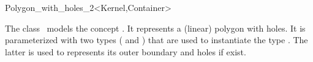 \ccRefPageBegin

\begin{ccRefClass}{Polygon_with_holes_2<Kernel,Container>}

\ccThreeToTwo

\ccDefinition
The class \ccRefName\ models the concept .
It represents a (linear) polygon with holes. It is parameterized with two
types ( and ) that are used to instantiate
the type . The latter is used to
represents its outer boundary and holes if exist.

 
\ccIsModel

\end{ccRefClass}
\ccRefPageEnd
